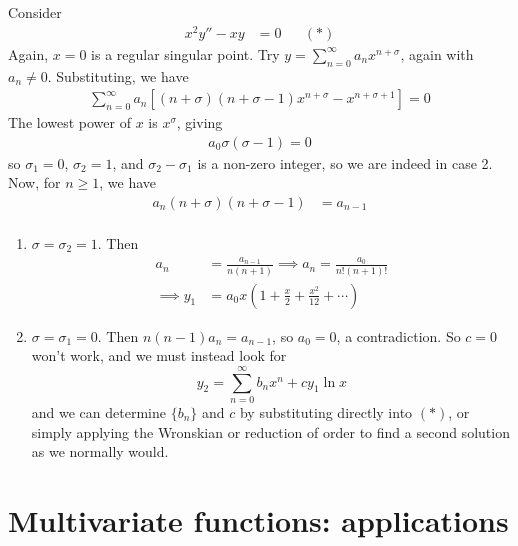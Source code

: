 \documentclass{../template/note}
\begin{document}
    \begin{example}[Case 2]
        Consider
        \begin{align*}
            x^2y'' - xy &= 0 && (*)
        \end{align*}
        Again, \(x=0\) is a regular singular point. Try \(y = \sum_{n=0}^\infty a_n x^{n+\sigma}\), again with \(a_n \neq 0\). Substituting, we have
        \begin{align*}
            \sum_{n=0}^\infty a_n\left[(n+\sigma)(n+\sigma-1)x^{n+\sigma}-x^{n+\sigma+1}\right] = 0
        \end{align*}
        The lowest power of \(x\) is \(x^\sigma\), giving
        \begin{align*}
            a_0\sigma(\sigma-1)=0
        \end{align*}
        so \(\sigma_1 = 0\), \(\sigma_2 = 1\), and \(\sigma_2-\sigma_1\) is a non-zero integer, so we are indeed in case 2. Now, for \(n \geq 1\), we have
        \begin{align*}
            a_n(n+\sigma)(n+\sigma-1)&=a_{n-1} \\
        \end{align*}
        \begin{enumerate}[label=\protect\circled{\arabic*}]
            \item \(\sigma=\sigma_2=1\). Then
            \begin{align*}
                a_n &= \frac{a_{n-1}}{n(n+1)} \implies a_n = \frac{a_0}{n!(n+1)!} \\
                \implies y_1 &= a_0x\left(1+\frac x 2 + \frac{x^2}{12} + \cdots\right)
            \end{align*}
            \item \(\sigma=\sigma_1=0\). Then \(n(n-1)a_n = a_{n-1}\), so \(a_0 = 0\), a contradiction. So \(c=0\) won't work, and we must instead look for
            \[
                y_2 = \sum_{n=0}^\infty b_nx^n + cy_1 \ln x
            \]
            and we can determine \(\{b_n\}\) and \(c\) by substituting directly into \((*)\), or simply applying the Wronskian or reduction of order to find a second solution as we normally would.
        \end{enumerate}
    \end{example}


    \section{Multivariate functions: applications}
\end{document}
